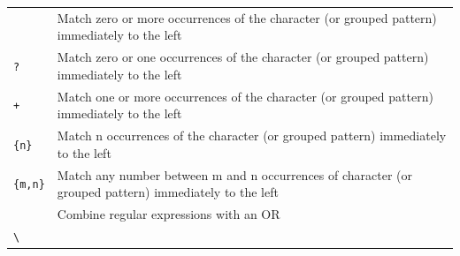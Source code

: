 \documentclass[]{krantz}
\begin{document}
\begin{longtable}[]{@{}ll@{}}
\begin{minipage}[t]{0.25\columnwidth}
\end{minipage} & \begin{minipage}[t]{0.43\columnwidth}\raggedright
Match zero or more occurrences
of the character (or grouped
pattern) immediately to the
left\strut
\end{minipage}\tabularnewline
\begin{minipage}[t]{0.25\columnwidth}\raggedright
\texttt{?}\strut
\end{minipage} & \begin{minipage}[t]{0.43\columnwidth}\raggedright
Match zero or one occurrences
of the character (or grouped
pattern) immediately to the
left\strut
\end{minipage}\tabularnewline
\begin{minipage}[t]{0.25\columnwidth}\raggedright
\texttt{+}\strut
\end{minipage} & \begin{minipage}[t]{0.43\columnwidth}\raggedright
Match one or more occurrences
of the character (or grouped
pattern) immediately to the
left\strut
\end{minipage}\tabularnewline
\begin{minipage}[t]{0.25\columnwidth}\raggedright
\texttt{\{n\}}\strut
\end{minipage} & \begin{minipage}[t]{0.43\columnwidth}\raggedright
Match n occurrences of the
character (or grouped pattern)
immediately to the left\strut
\end{minipage}\tabularnewline
\begin{minipage}[t]{0.25\columnwidth}\raggedright
\texttt{\{m,n\}}\strut
\end{minipage} & \begin{minipage}[t]{0.43\columnwidth}\raggedright
Match any number between m and
n occurrences of character (or
grouped pattern) immediately
to the left\strut
\end{minipage}\tabularnewline
\begin{minipage}[t]{0.25\columnwidth}\raggedright
\texttt{\textbar{}}\strut
\end{minipage} & \begin{minipage}[t]{0.43\columnwidth}\raggedright
Combine regular expressions
with an OR\strut
\end{minipage}\tabularnewline
\begin{minipage}[t]{0.25\columnwidth}\raggedright
\texttt{\textbackslash{}}\strut
\end{minipage} & \begin{minipage}[t]{0.43\columnwidth}\raggedright

\end{minipage}
\end{longtable}
\end{document}
